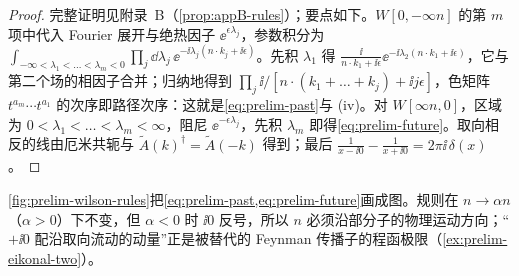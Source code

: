 \begin{proof}
完整证明见附录~B（\cref{prop:appB-rules}）；要点如下。$W[0,-\infty n]$ 的第 $m$ 项中代入 Fourier 展开与绝热因子 $\ee^{\epsilon\lambda_j}$，参数积分为 $\int_{-\infty<\lambda_1<\dots<\lambda_m<0}\prod_j\dd\lambda_j\,\ee^{-\ii\lambda_j(n\cdot k_j+\ii\epsilon)}$。先积 $\lambda_1$ 得 $\frac{\ii}{n\cdot k_1+\ii\epsilon}\ee^{-\ii\lambda_2(n\cdot k_1+\ii\epsilon)}$，它与第二个场的相因子合并；归纳地得到 $\prod_j\ii/[n\cdot(k_1+\dots+k_j)+\ii j\epsilon]$，色矩阵 $t^{a_m}\cdots t^{a_1}$ 的次序即路径次序：这就是\cref{eq:prelim-past}与 (iv)。对 $W[\infty n,0]$，区域为 $0<\lambda_1<\dots<\lambda_m<\infty$，阻尼 $\ee^{-\epsilon\lambda_j}$，先积 $\lambda_m$ 即得\cref{eq:prelim-future}。取向相反的线由厄米共轭与 $\tilde A(k)^\dagger=\tilde A(-k)$ 得到；最后 $\frac1{x-\ii0}-\frac1{x+\ii0}=2\pi\ii\,\delta(x)$。
\end{proof}

\cref{fig:prelim-wilson-rules}把\cref{eq:prelim-past,eq:prelim-future}画成图。规则在 $n\to\alpha n$（$\alpha>0$）下不变，但 $\alpha<0$ 时 $\ii0$ 反号，所以 $n$ 必须沿部分子的物理运动方向；“$+\ii0$ 配沿取向流动的动量”正是被替代的 Feynman 传播子的程函极限（\cref{ex:prelim-eikonal-two}）。

